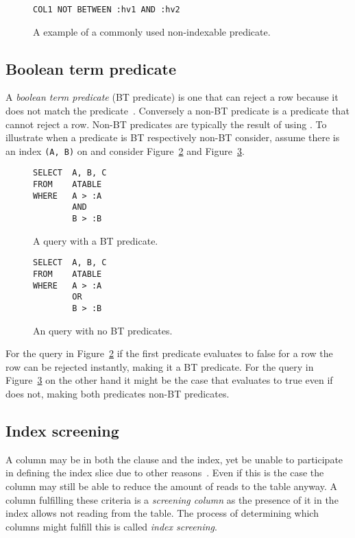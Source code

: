 \begin{figure}[ht]
\begin{verbatim}
COL1 NOT BETWEEN :hv1 AND :hv2
\end{verbatim}
\caption[An example of a non-indexable predicate]{A example of a commonly used non-indexable predicate.}\label{fig:sql:nonindexable}
\end{figure}

\subsection*{Boolean term predicate}
A \textit{boolean term predicate} (BT predicate) is one that can reject a row because it does not match the predicate~\cite{lahdenmaki_2005_relational_rdidatodossea}. Conversely a non-BT predicate is a predicate that cannot reject a row. Non-BT predicates are typically the result of using . To illustrate when a predicate is BT respectively non-BT consider, assume there is an index \texttt{(A, B)} on  and consider Figure~\ref{fig:sql:btpredicate} and Figure~\ref{fig:sql:nonbtpredicate}.

\begin{figure}[ht]
\begin{verbatim}
SELECT  A, B, C
FROM    ATABLE
WHERE   A > :A
        AND
        B > :B
\end{verbatim}
\caption[A query containing a BT predicate]{A query with a BT predicate.}\label{fig:sql:btpredicate}
\end{figure}

\begin{figure}[ht]
\begin{verbatim}
SELECT  A, B, C
FROM    ATABLE
WHERE   A > :A
        OR
        B > :B
\end{verbatim}
\caption[A query containing no BT predicates]{An query with no BT predicates.}\label{fig:sql:nonbtpredicate}
\end{figure}

For the query in Figure~\ref{fig:sql:btpredicate} if the first predicate  evaluates to false for a row the row can be rejected instantly, making it a BT predicate. For the query in Figure~\ref{fig:sql:nonbtpredicate} on the other hand it might be the case that  evaluates to true even if  does not, making both predicates non-BT predicates.

\subsection*{Index screening}
A column may be in both the  clause and the index, yet be unable to participate in defining the index slice due to other reasons~\cite{lahdenmaki_2005_relational_rdidatodossea}. Even if this is the case the column may still be able to reduce the amount of reads to the table anyway. A column fulfilling these criteria is a \textit{screening column} as the presence of it in the index allows not reading from the table. The process of determining which columns might fulfill this is called \textit{index screening}.

